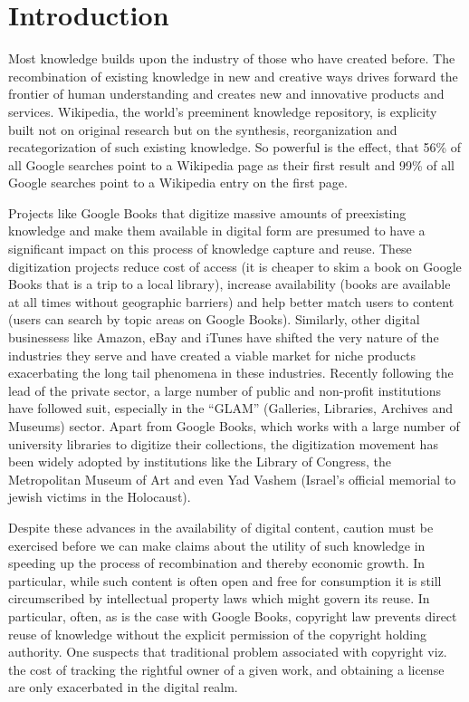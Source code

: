 \documentclass[12pt]{article}
\begin{document}
\section{Introduction}


Most knowledge builds upon the industry of those who have created before. The recombination of existing knowledge in new and creative ways drives forward the frontier of human understanding and creates new and innovative products and services. Wikipedia, the world's preeminent knowledge repository, is explicity built not on original research but on the synthesis, reorganization and recategorization of such existing knowledge. So powerful is the effect, that 56\% of all Google searches point to a Wikipedia page as their first result and 99\% of all Google searches point to a Wikipedia entry on the first page. 

Projects like Google Books that digitize massive amounts of preexisting knowledge and make them available in digital form are presumed to have a significant impact on this process of knowledge capture and reuse. These digitization projects reduce cost of access (it is cheaper to skim a book on Google Books that is a trip to a local library), increase availability (books are available at all times without geographic barriers) and help better match users to content (users can search by topic areas on Google Books).  Similarly, other digital businessess like Amazon, eBay and iTunes have shifted the very nature of the industries they serve  and have created a viable market for niche products exacerbating the long tail phenomena in these industries. Recently following the lead of the private sector, a large number of public and non-profit institutions have followed suit, especially in the ``GLAM'' (Galleries, Libraries, Archives and Museums) sector.  Apart from Google Books, which works with a large number of university libraries to digitize their collections, the digitization movement has been widely adopted by institutions like the Library of Congress, the Metropolitan Museum of Art and even Yad Vashem (Israel's official memorial to jewish victims in the Holocaust). 

Despite these advances in the availability of digital content, caution must be exercised before we can make claims about the utility of such knowledge in speeding up the process of recombination and thereby economic growth. In particular, while such content is often open and free for consumption it is still circumscribed by intellectual property laws which might govern its reuse. In particular, often, as is the case with Google Books, copyright law prevents direct reuse of knowledge without the explicit permission of the copyright holding authority. One suspects that traditional problem associated with copyright viz. the cost of tracking the rightful owner of a given work, and obtaining a license are only exacerbated in the digital realm. 
\end{document}
